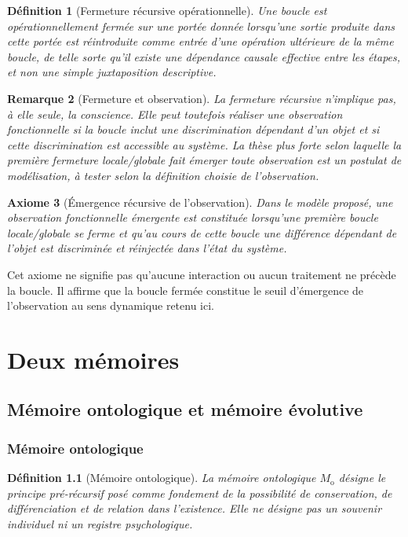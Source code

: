 \documentclass[11pt,a4paper,openany]{book}
\newtheorem{definition}{Définition}[chapter]
\newtheorem{axiom}[definition]{Axiome}
\newtheorem{remark}[definition]{Remarque}
\newcommand{\Monto}{M_{\mathrm{o}}}
\begin{document}
\begin{definition}[Fermeture récursive opérationnelle]
Une boucle est opérationnellement fermée sur une portée donnée lorsqu'une sortie produite dans cette portée est réintroduite comme entrée d'une opération ultérieure de la même boucle, de telle sorte qu'il existe une dépendance causale effective entre les étapes, et non une simple juxtaposition descriptive.
\end{definition}

\begin{remark}[Fermeture et observation]
La fermeture récursive n'implique pas, à elle seule, la conscience. Elle peut toutefois réaliser une observation fonctionnelle si la boucle inclut une discrimination dépendant d'un objet et si cette discrimination est accessible au système. La thèse plus forte selon laquelle la première fermeture locale/globale fait émerger toute observation est un postulat de modélisation, à tester selon la définition choisie de l'observation.
\end{remark}

\begin{axiom}[Émergence récursive de l'observation]
Dans le modèle proposé, une observation fonctionnelle émergente est constituée lorsqu'une première boucle locale/globale se ferme et qu'au cours de cette boucle une différence dépendant de l'objet est discriminée et réinjectée dans l'état du système.
\end{axiom}

Cet axiome ne signifie pas qu'aucune interaction ou aucun traitement ne précède la boucle. Il affirme que la boucle fermée constitue le seuil d'émergence de l'observation au sens dynamique retenu ici.

\part{Deux mémoires}
\chapter{Mémoire ontologique et mémoire évolutive}

\section{Mémoire ontologique}
\begin{definition}[Mémoire ontologique]
La mémoire ontologique $\Monto$ désigne le principe pré-récursif posé comme fondement de la possibilité de conservation, de différenciation et de relation dans l'existence. Elle ne désigne pas un souvenir individuel ni un registre psychologique.
\end{definition}
\end{document}
